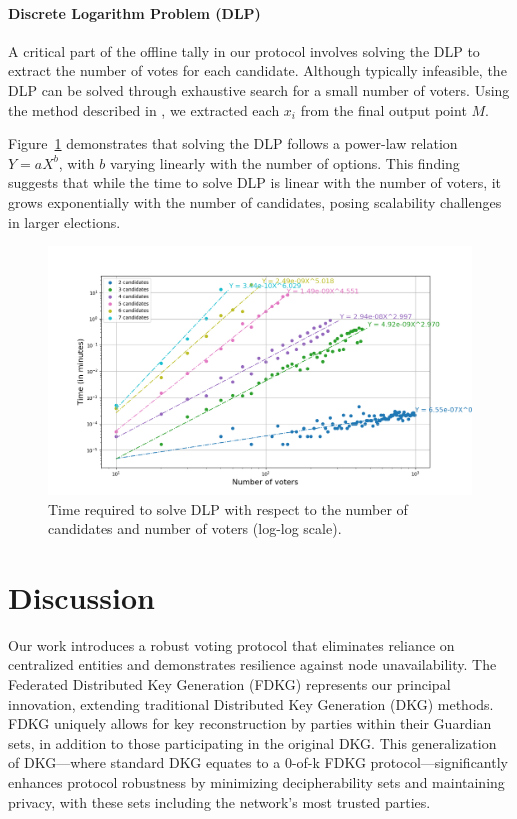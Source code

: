 \documentclass[runningheads]{llncs}
\begin{document}
\paragraph{Discrete Logarithm Problem (DLP)}

A critical part of the offline tally in our protocol involves solving the DLP to extract the number of votes for each candidate. Although typically infeasible, the DLP can be solved through exhaustive search for a small number of voters. Using the method described in \cite{haoAnonymousVotingTworound2010}, we extracted each $x_i$ from the final output point $M$. 

Figure~\ref{fig:dlog-search} demonstrates that solving the DLP follows a power-law relation \( Y = aX^b \), with \( b \) varying linearly with the number of options. This finding suggests that while the time to solve DLP is linear with the number of voters, it grows exponentially with the number of candidates, posing scalability challenges in larger elections.

\begin{figure}
    \centering
    \includegraphics[width=.9\textwidth]{dlog-search.png}
    \caption{Time required to solve DLP with respect to the number of candidates and number of voters (log-log scale).}
    \label{fig:dlog-search}
\end{figure}

\section{Discussion}

Our work introduces a robust voting protocol that eliminates reliance on centralized entities and demonstrates resilience against node unavailability. The Federated Distributed Key Generation (FDKG) represents our principal innovation, extending traditional Distributed Key Generation (DKG) methods. FDKG uniquely allows for key reconstruction by parties within their Guardian sets, in addition to those participating in the original DKG. This generalization of DKG—where standard DKG equates to a 0-of-k FDKG protocol—significantly enhances protocol robustness by minimizing decipherability sets and maintaining privacy, with these sets including the network's most trusted parties.
\end{document}
